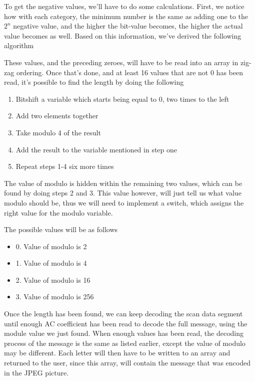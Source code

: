 To get the negative values, we'll have to do some calculations. 
First, we notice how with each category, the minimum number is the same as adding one to the $2^n$ negative value, and the higher the bit-value becomes, the higher the actual value becomes as well. 
Based on this information, we've derived the following algorithm

These values, and the preceding zeroes, will have to be read into an array in zig-zag ordering.
Once that's done, and at least 16 values that are not 0 has been read, it's possible to find the length by doing the following
\begin{enumerate}
	\item Bitshift a variable which starts being equal to 0, two times to the left
	\item Add two elements together
	\item Take modulo 4 of the result
	\item Add the result to the variable mentioned in step one
	\item Repeat steps 1-4 six more times
\end{enumerate}
The value of modulo is hidden within the remaining two values, which can be found by doing steps 2 and 3. This value however, will just tell us what value modulo should be, thus we will need to implement a switch, which assigns the right value for the modulo variable.

The possible values will be as follows
\begin{itemize}
	\item 0. Value of modulo is 2
	\item 1. Value of modulo is 4
	\item 2. Value of modulo is 16
	\item 3. Value of modulo is 256
\end{itemize}
Once the length has been found, we can keep decoding the scan data segment until enough AC coefficient has been read to decode the full message, using the module value we just found.
When enough values has been read, the decoding process of the message is the same as listed earlier, except the value of modulo may be different. 
Each letter will then have to be written to an array and returned to the user, since this array, will contain the message that was encoded in the JPEG picture.